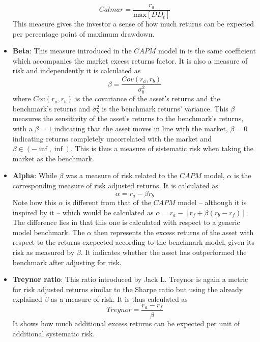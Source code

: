 \begin{itemize}
    \begin{equation}
        Calmar=\frac{r_a}{\text{max}\left[DD_t\right]}
    \end{equation}
    This measure gives the investor a sense of how much returns can be expected per percentage point of maximum drawdown. 
    \item \textbf{Beta}: This measure introduced in the $CAPM$ model in \cite{sharpe_1964} is the same coefficient which accompanies the market excess returns factor. It is also a measure of risk and independently it is calculated as 
    \begin{equation}
        \beta=\frac{Cov\left(r_a,r_b\right)}{\sigma^2_b}
    \end{equation}
    where $Cov\left(r_a,r_b\right)$ is the covariance of the asset's returns and the benchmark's returns and $\sigma^2_b$ is the benchmark returns' variance. This $\beta$ measures the sensitivity of the asset's returns to the benchmark's returns, with a $\beta=1$ indicating that the asset moves in line with the market, $\beta=0$ indicating returns completely uncorrelated with the market and $\beta \in \left(-\inf,\inf\right)$. This is thus a measure of sistematic risk when taking the market as the benchmark.
    \item \textbf{Alpha}: While $\beta$ was a measure of risk related to the $CAPM$ model, $\alpha$ is the corresponding measure of risk adjusted returns. It is calculated as
    \begin{equation}
        \alpha=r_a-\beta r_b
    \end{equation}
    Note how this $\alpha$ is different from that of the $CAPM$ model -- although it is inspired by it -- which would be calculated as $\alpha=r_a-\left[r_f+\beta\left(r_b-r_f\right)\right]$. The difference lies in that this one is calculated with respect to a generic model benchmark. The $\alpha$ then represents the excess returns of the asset with respect to the returns excpected according to the benchmark model, given its risk as measured by $\beta$. It indicates whether the asset has outperformed the benchmark after adjusting for risk.
    \item \textbf{Treynor ratio}: This ratio introduced by Jack L. Treynor is again a metric for risk adjusted returns similar to the Sharpe ratio but using the already explained $\beta$ as a measure of risk. It is thus calculated as 
    \begin{equation}
        Treynor=\frac{r_a-r_f}{\beta}
    \end{equation}
    It shows how much additional excess returns can be expected per unit of additional systematic risk.  
\end{itemize}